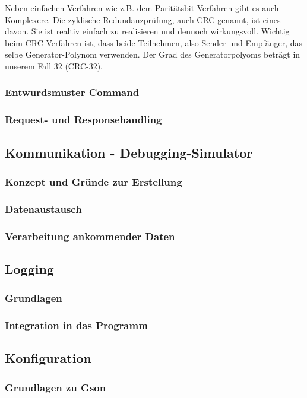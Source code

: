 Neben einfachen Verfahren wie z.B. dem Paritätsbit-Verfahren gibt es auch Komplexere. Die zyklische Redundanzprüfung, auch CRC genannt, ist eines davon. Sie ist realtiv einfach zu realisieren und dennoch wirkungsvoll.
Wichtig beim CRC-Verfahren ist, dass beide Teilnehmen, also Sender und Empfänger, das selbe Generator-Polynom verwenden. Der Grad des Generatorpolyoms beträgt in unserem Fall 32 (CRC-32).

\subsubsection{Entwurdsmuster Command}
\subsubsection{Request- und Responsehandling}

\subsection{Kommunikation - Debugging-Simulator}
\subsubsection{Konzept und Gründe zur Erstellung}
\subsubsection{Datenaustausch}
\subsubsection{Verarbeitung ankommender Daten}


\subsection{Logging}
\subsubsection{Grundlagen}
\subsubsection{Integration in das Programm}
\subsection{Konfiguration}
\subsubsection{Grundlagen zu Gson}
